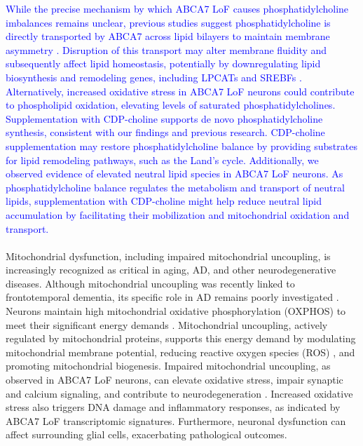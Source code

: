 \newcommand{\quoteI}{\textcolor{blue}{While the precise mechanism by which ABCA7 LoF causes phosphatidylcholine imbalances remains unclear, previous studies suggest phosphatidylcholine is directly transported by ABCA7 across lipid bilayers to maintain membrane asymmetry \cite{LeThiMy2022-dp,Fang2025}. Disruption of this transport may alter membrane fluidity and subsequently affect lipid homeostasis, potentially by downregulating lipid biosynthesis and remodeling genes, including LPCATs and SREBFs \cite{Wang2019-om}. Alternatively, increased oxidative stress in ABCA7 LoF neurons could contribute to phospholipid oxidation, elevating levels of saturated phosphatidylcholines. Supplementation with CDP-choline supports de novo phosphatidylcholine synthesis, consistent with our findings and previous research. CDP-choline supplementation may restore phosphatidylcholine balance by providing substrates for lipid remodeling pathways, such as the Land’s cycle. Additionally, we observed evidence of elevated neutral lipid species in ABCA7 LoF neurons. As phosphatidylcholine balance regulates the metabolism and transport of neutral lipids, supplementation with CDP-choline might help reduce neutral lipid accumulation by facilitating their mobilization and mitochondrial oxidation and transport.\label{quoteI-label}}} 
\quoteI\\\\
Mitochondrial dysfunction, including impaired mitochondrial uncoupling, is increasingly recognized as critical in aging, AD, and other neurodegenerative diseases. Although mitochondrial uncoupling was recently linked to frontotemporal dementia, its specific role in AD remains poorly investigated \cite{noauthor_2022-os,Bano2023-qz,Zong2024-tn,Demine2019-qj,noauthor_2013-rt,Picca2023-gt}. Neurons maintain high mitochondrial oxidative phosphorylation (OXPHOS) to meet their significant energy demands \cite{Morant-Ferrando2023-va,Trigo2022-ym}. Mitochondrial uncoupling, actively regulated by mitochondrial proteins\cite{Park2023-fa,noauthor_2016-fg}, supports this energy demand by modulating mitochondrial membrane potential, reducing reactive oxygen species (ROS) \cite{Demine2019-qj,Shadel2015-kt}, and promoting mitochondrial biogenesis\cite{Korshunov1997-aj,Wisloff2005-ho,Andrews2005-yy,noauthor_2022-vx}. Impaired mitochondrial uncoupling, as observed in ABCA7 LoF neurons, can elevate oxidative stress, impair synaptic and calcium signaling, and contribute to neurodegeneration \cite{Korshunov1997-aj,Wisloff2005-ho,Andrews2005-yy,noauthor_2022-vx}. Increased oxidative stress also triggers DNA damage and inflammatory responses, as indicated by ABCA7 LoF transcriptomic signatures\cite{Robert2020-sc,Volanti2002-mc,Canty1999-oj,Schreck1992-zr}. Furthermore, neuronal dysfunction can affect surrounding glial cells, exacerbating pathological outcomes\cite{Byrns2024-id,Welch2022-ef}.

